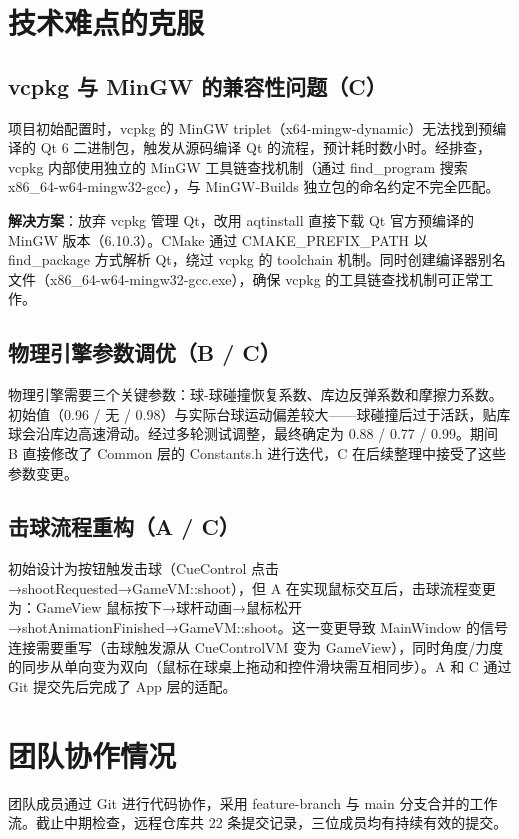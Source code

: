 \documentclass[11pt]{ctexart}
\begin{document}
\section{技术难点的克服}

\subsection{vcpkg 与 MinGW 的兼容性问题（C）}

项目初始配置时，vcpkg 的 MinGW triplet（x64-mingw-dynamic）无法找到预编译的 Qt 6 二进制包，触发从源码编译 Qt 的流程，预计耗时数小时。经排查，vcpkg 内部使用独立的 MinGW 工具链查找机制（通过 find\_program 搜索 x86\_64-w64-mingw32-gcc），与 MinGW-Builds 独立包的命名约定不完全匹配。

\textbf{解决方案}：放弃 vcpkg 管理 Qt，改用 aqtinstall 直接下载 Qt 官方预编译的 MinGW 版本（6.10.3）。CMake 通过 CMAKE\_PREFIX\_PATH 以 find\_package 方式解析 Qt，绕过 vcpkg 的 toolchain 机制。同时创建编译器别名文件（x86\_64-w64-mingw32-gcc.exe），确保 vcpkg 的工具链查找机制可正常工作。

\subsection{物理引擎参数调优（B / C）}

物理引擎需要三个关键参数：球-球碰撞恢复系数、库边反弹系数和摩擦力系数。初始值（0.96 / 无 / 0.98）与实际台球运动偏差较大——球碰撞后过于活跃，贴库球会沿库边高速滑动。经过多轮测试调整，最终确定为 0.88 / 0.77 / 0.99。期间 B 直接修改了 Common 层的 Constants.h 进行迭代，C 在后续整理中接受了这些参数变更。

\subsection{击球流程重构（A / C）}

初始设计为按钮触发击球（CueControl 点击→shootRequested→GameVM::shoot），但 A 在实现鼠标交互后，击球流程变更为：GameView 鼠标按下→球杆动画→鼠标松开→shotAnimationFinished→GameVM::shoot。这一变更导致 MainWindow 的信号连接需要重写（击球触发源从 CueControlVM 变为 GameView），同时角度/力度的同步从单向变为双向（鼠标在球桌上拖动和控件滑块需互相同步）。A 和 C 通过 Git 提交先后完成了 App 层的适配。

\section{团队协作情况}

团队成员通过 Git 进行代码协作，采用 feature-branch 与 main 分支合并的工作流。截止中期检查，远程仓库共 22 条提交记录，三位成员均有持续有效的提交。
\end{document}

